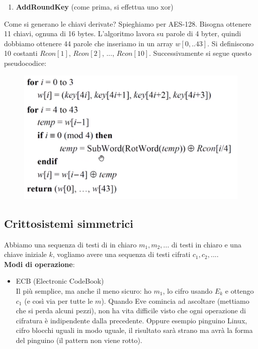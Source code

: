 \begin{itemize}
\begin{enumerate}
			\item \textbf{AddRoundKey} (come prima, si effettua uno xor)
		\end{enumerate} 
		
	Come si generano le chiavi derivate? Spieghiamo per AES-128.
	Bisogna ottenere 11 chiavi, ognuna di 16 bytes. L'algoritmo lavora su parole di 4 byter, quindi dobbiamo ottenere 44 parole che inseriamo in un array $w[0,..43]$. Si definiscono 10 costanti $Rcon[1]$, $Rcon[2]$, ..., $Rcon[10]$. Successivamente si segue questo pseudocodice:
	
		\begin{figure}[h]
		\centering
		\includegraphics[width=0.9\linewidth]{immagini/img36}
	\end{figure}

\subsection*{Crittosistemi simmetrici}

Abbiamo una sequenza di testi di in chiaro $m_1, m_2, ...$ di testi in chiaro e una chiave iniziale $k$, vogliamo avere una sequenza di testi cifrati $c_1, c_2,...$.\\
\textbf{Modi di operazione}: 
\begin{itemize}
	\item ECB (Electronic CodeBook)\\
	Il più semplice, ma anche il meno sicuro: ho $m_1$, lo cifro usando $E_k$ e ottengo $c_1$ (e così via per tutte le $m$). Quando Eve comincia ad ascoltare (mettiamo che si perda alcuni pezzi), non ha vita difficile visto che ogni operazione di cifratura è indipendente dalla precedente. Oppure esempio pinguino Linux, cifro blocchi uguali in modo uguale, il risultato sarà strano ma avrà la forma del pinguino (il pattern non viene rotto).
\end{itemize}


	
\end{itemize}
